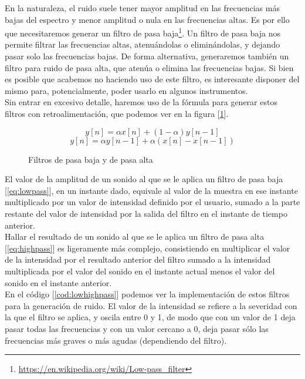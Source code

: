 En la naturaleza, el ruido suele tener mayor amplitud en las frecuencias más bajas del espectro y menor amplitud o nula en las frecuencias altas. Es por ello que necesitaremos generar un filtro de pasa baja\footnote{\url{https://en.wikipedia.org/wiki/Low-pass_filter}}. Un filtro de pasa baja nos permite filtrar las frecuencias altas, atenuándolas o eliminándolas, y dejando pasar solo las frecuencias bajas. De forma alternativa, generaremos también un filtro para ruido de pasa alta, que atenúa o elimina las frecuencias bajas. Si bien es posible que acabemos no haciendo uso de este filtro, es interesante disponer del mismo para, potencialmente, poder usarlo en algunos instrumentos.\\

Sin entrar en excesivo detalle, haremos uso de la fórmula para generar estos filtros con retroalimentación, que podemos ver en la figura [\ref{fig:filtros}].\\

\begin{figure}[h]
	\begin{equation}
		y[n] = \alpha x[n] + (1 - \alpha) y[n-1] 
		\label{eq:lowpass}
	\end{equation}
	\begin{equation}
		y[n] = \alpha y[n - 1] + \alpha (x[n] - x[n-1]) 
		\label{eq:highpass}
	\end{equation}
	\caption{Filtros de pasa baja y de pasa alta}
	\label{fig:filtros}
\end{figure}

El valor de la amplitud de un sonido al que se le aplica un filtro de pasa baja [\ref{eq:lowpass}], en un instante dado, equivale al valor de la muestra en ese instante multiplicado por un valor de intensidad definido por el usuario, sumado a la parte restante del valor de intensidad por la salida del filtro en el instante de tiempo anterior.\\

Hallar el resultado de un sonido al que se le aplica un filtro de pasa alta [\ref{eq:highpass}] es ligeramente más complejo, consistiendo en multiplicar el valor de la intensidad por el resultado anterior del filtro sumado a la intensidad multiplicada por el valor del sonido en el instante actual menos el valor del sonido en el instante anterior.\\

En el código [\ref{cod:lowhighpass}] podemos ver la implementación de estos filtros para la generación de ruido. El valor de la intensidad se refiere a la severidad con la que el filtro se aplica, y oscila entre 0 y 1, de modo que con un valor de 1 deja pasar todas las frecuencias y con un valor cercano a 0, deja pasar sólo las frecuencias más graves o más agudas (dependiendo del filtro).\\

